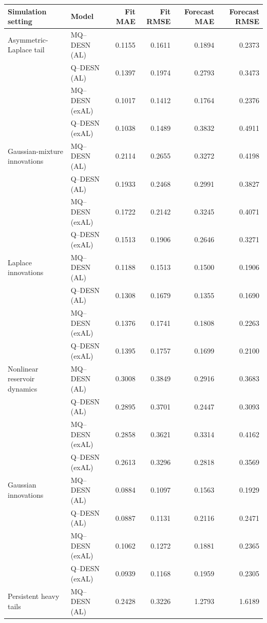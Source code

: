 \begin{table}[p]
\centering
\footnotesize
\setlength{\tabcolsep}{3pt}
\renewcommand{\arraystretch}{1.08}
\begin{tabular}{@{}>{\raggedright\arraybackslash}p{}>{\raggedright\arraybackslash}p{}rrrr@{}}
\toprule
Simulation setting & Model & Fit MAE & Fit RMSE & Forecast MAE & Forecast RMSE \\
\midrule
Asymmetric-Laplace tail & MQ--DESN (AL) & 0.1155 & 0.1611 & 0.1894 & 0.2373 \\
 & Q--DESN (AL) & 0.1397 & 0.1974 & 0.2793 & 0.3473 \\
 & MQ--DESN (exAL) & 0.1017 & 0.1412 & 0.1764 & 0.2376 \\
 & Q--DESN (exAL) & 0.1038 & 0.1489 & 0.3832 & 0.4911 \\
\addlinespace[2pt]
Gaussian-mixture innovations & MQ--DESN (AL) & 0.2114 & 0.2655 & 0.3272 & 0.4198 \\
 & Q--DESN (AL) & 0.1933 & 0.2468 & 0.2991 & 0.3827 \\
 & MQ--DESN (exAL) & 0.1722 & 0.2142 & 0.3245 & 0.4071 \\
 & Q--DESN (exAL) & 0.1513 & 0.1906 & 0.2646 & 0.3271 \\
\addlinespace[2pt]
Laplace innovations & MQ--DESN (AL) & 0.1188 & 0.1513 & 0.1500 & 0.1906 \\
 & Q--DESN (AL) & 0.1308 & 0.1679 & 0.1355 & 0.1690 \\
 & MQ--DESN (exAL) & 0.1376 & 0.1741 & 0.1808 & 0.2263 \\
 & Q--DESN (exAL) & 0.1395 & 0.1757 & 0.1699 & 0.2100 \\
\addlinespace[2pt]
Nonlinear reservoir dynamics & MQ--DESN (AL) & 0.3008 & 0.3849 & 0.2916 & 0.3683 \\
 & Q--DESN (AL) & 0.2895 & 0.3701 & 0.2447 & 0.3093 \\
 & MQ--DESN (exAL) & 0.2858 & 0.3621 & 0.3314 & 0.4162 \\
 & Q--DESN (exAL) & 0.2613 & 0.3296 & 0.2818 & 0.3569 \\
\addlinespace[2pt]
Gaussian innovations & MQ--DESN (AL) & 0.0884 & 0.1097 & 0.1563 & 0.1929 \\
 & Q--DESN (AL) & 0.0887 & 0.1131 & 0.2116 & 0.2471 \\
 & MQ--DESN (exAL) & 0.1062 & 0.1272 & 0.1881 & 0.2365 \\
 & Q--DESN (exAL) & 0.0939 & 0.1168 & 0.1959 & 0.2305 \\
\addlinespace[2pt]
Persistent heavy tails & MQ--DESN (AL) & 0.2428 & 0.3226 & 1.2793 & 1.6189 \\

\end{tabular}
\end{table}
